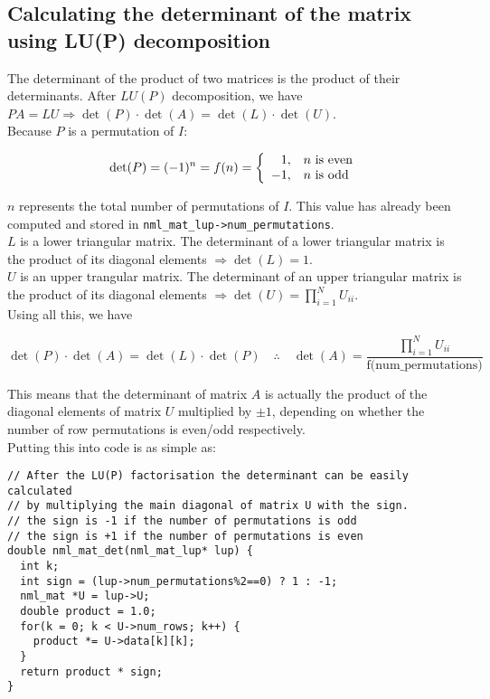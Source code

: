 \subsection{Calculating the determinant of the matrix using LU(P) decomposition}

The determinant of the product of two matrices is the product of their determinants. After $LU(P)$ decomposition, we have $PA = LU \Rightarrow \det(P) \cdot \det(A) = \det(L) \cdot \det(U)$.
\\

Because $P$ is a permutation of $I$:

$$
\det(P) = (-1)^{n} = f(n) = 
\left\{ \begin{array}{r@{\quad}l}
1, & n \text{ is even} \\
-1, & n \text{ is odd}
\end{array} \right.
$$

$n$ represents the total number of permutations of $I$. This value has already been computed and stored in {\tt nml\_mat\_lup->num\_permutations}.
\\

$L$ is a lower triangular matrix. The determinant of a lower triangular matrix is the product of its diagonal elements $\Rightarrow \det(L) = 1$.
\\

$U$ is an upper trangular matrix. The determinant of an upper triangular matrix is the product of its diagonal elements $\Rightarrow \det(U) = \prod_{i=1}^{N} U_{ii}$.
\\

Using all this, we have

$$
\det(P) \cdot \det(A) = \det(L) \cdot \det(P) \quad \therefore \quad \det(A) = \frac{\prod_{i=1}^{N} U_{ii}}{\text{f(num\_permutations)}}
$$

This means that the determinant of matrix $A$ is actually the product of the diagonal elements of matrix $U$ multiplied by $\pm 1$, depending on whether the number of row permutations is even/odd respectively.
\\

Putting this into code is as simple as:

\begin{verbatim}
// After the LU(P) factorisation the determinant can be easily calculated
// by multiplying the main diagonal of matrix U with the sign.
// the sign is -1 if the number of permutations is odd
// the sign is +1 if the number of permutations is even
double nml_mat_det(nml_mat_lup* lup) {
  int k;
  int sign = (lup->num_permutations%2==0) ? 1 : -1;
  nml_mat *U = lup->U;
  double product = 1.0;
  for(k = 0; k < U->num_rows; k++) {
    product *= U->data[k][k];
  }
  return product * sign;
}
\end{verbatim}

